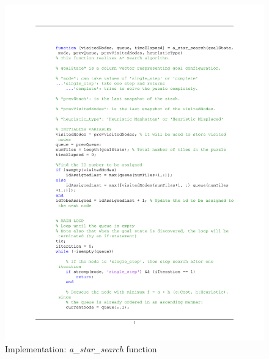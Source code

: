 \documentclass[12pt]{article}
\begin{document}
\begin{figure}[htb]
	\centering
	\includegraphics[width=1\columnwidth]{images/Code_a_star_search.pdf}
	\caption{Implementation: \textit{a\_star\_search} function}
	\label{}
\end{figure}
\end{document}
